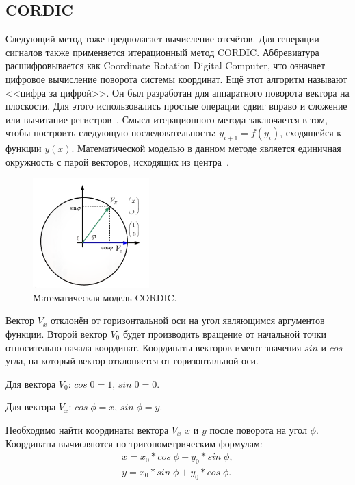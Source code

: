\subsection{CORDIC}
	Следующий метод тоже предполагает вычисление отсчётов. Для генерации сигналов также применяется итерационный метод CORDIC. 
	Аббревиатура расшифровывается как Coordinate Rotation Digital Computer, что означает цифровое вычисление поворота системы координат. Ещё этот алгоритм называют <<цифра за цифрой>>. Он был разработан для аппаратного поворота вектора на плоскости. Для этого использовались простые операции сдвиг вправо и сложение или вычитание регистров~\cite{dds_en}.
	Смысл итерационного метода заключается в том, чтобы построить следующую последовательность: $y_{i+1}=f(y_{i})$, сходящейся к функции $y(x)$. Математической моделью в данном методе является единичная окружность с парой векторов, исходящих из центра~\cite{cordic}.
	
	\begin{figure}[H]
    \centering
    \includegraphics[width=0.4\textwidth]{../image/cordic.png}
    \caption{Математическая модель CORDIC.}
	\end{figure}

	Вектор $V_{x}$ отклонён от горизонтальной оси на угол являющимся аргументов функции. Второй вектор $V_{0}$ будет производить вращение от начальной точки относительно начала координат. Координаты векторов имеют значения $sin$ и $cos$ угла, на который вектор отклоняется от горизонтальной оси. 

	Для вектора $V_{0}$: $cos\;0 = 1$, $sin\;0 = 0$. 

	Для вектора $V_{x}$: $cos\;\phi = x$, $sin\;\phi = y$.

	Необходимо найти координаты вектора $V_{x}$ $x$ и $y$ после поворота на угол $\phi$. Координаты вычисляются по тригонометрическим формулам:
	\begin{gather}
	x=x_{0}*cos\;\phi-y_{0}*sin\;\phi, \\
	y=x_{0}*sin\;\phi+y_{0}*cos\;\phi. 
	\end{gather}
	
